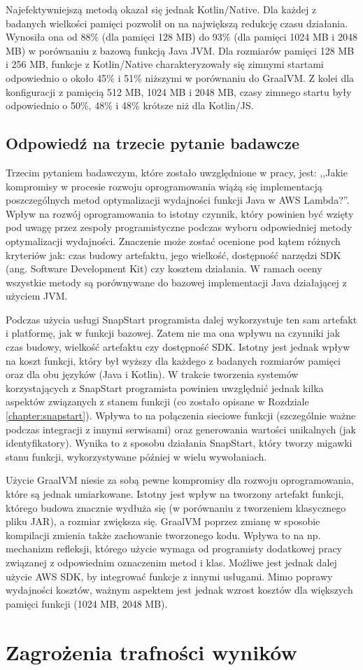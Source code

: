 Najefektywniejszą metodą okazał się jednak Kotlin/Native.
Dla każdej z badanych wielkości pamięci pozwolił on na największą redukcję czasu działania.
Wynosiła ona od 88\% (dla pamięci 128 MB) do 93\% (dla pamięci 1024 MB i 2048 MB) w porównaniu z bazową funkcją Java JVM.
Dla rozmiarów pamięci 128 MB i 256 MB, funkcje z Kotlin/Native charakteryzowały się zimnymi startami odpowiednio o około 45\% i 51\% niższymi w porównaniu do GraalVM.
Z kolei dla konfiguracji z pamięcią 512 MB, 1024 MB i 2048 MB, czasy zimnego startu były odpowiednio o 50\%, 48\% i 48\% krótsze niż dla Kotlin/JS.

\subsection*{Odpowiedź na trzecie pytanie badawcze}

Trzecim pytaniem badawczym, które zostało uwzględnione w pracy, jest: ,,Jakie kompromisy w procesie rozwoju oprogramowania wiążą się implementacją poszczególnych metod optymalizacji wydajności funkcji Java w AWS Lambda?''.
Wpływ na rozwój oprogramowania to istotny czynnik, który powinien być wzięty pod uwagę przez zespoły programistyczne podczas wyboru odpowiedniej metody optymalizacji wydajności.
Znaczenie może zostać ocenione pod kątem różnych kryteriów jak: czas budowy artefaktu, jego wielkość, dostępność narzędzi SDK (ang. Software Development Kit) czy kosztem działania.
W ramach oceny wszystkie metody są porównywane do bazowej implementacji Java działającej z użyciem JVM.

Podczas użycia usługi SnapStart programista dalej wykorzystuje ten sam artefakt i platformę, jak w funkcji bazowej.
Zatem nie ma ona wpływu na czynniki jak czas budowy, wielkość artefaktu czy dostępność SDK.
Istotny jest jednak wpływ na koszt funkcji, który był wyższy dla każdego z badanych rozmiarów pamięci oraz dla obu języków (Java i Kotlin).
W trakcie tworzenia systemów korzystających z SnapStart programista powinien uwzględnić jednak kilka aspektów związanych z stanem funkcji (co zostało opisane w Rozdziale \ref{chapter:snapstart}).
Wpływa to na połączenia sieciowe funkcji (szczególnie ważne podczas integracji z innymi serwisami) oraz generowania wartości unikalnych (jak identyfikatory).
Wynika to z sposobu działania SnapStart, który tworzy migawki stanu funkcji, wykorzystywane później w wielu wywołaniach.

Użycie GraalVM niesie za sobą pewne kompromisy dla rozwoju oprogramowania, które są jednak umiarkowane.
Istotny jest wpływ na tworzony artefakt funkcji, którego budowa znacznie wydłuża się (w porównaniu z tworzeniem klasycznego pliku JAR), a rozmiar zwiększa się.
GraalVM poprzez zmianę w sposobie kompilacji zmienia także zachowanie tworzonego kodu.
Wpływa to na np. mechanizm refleksji, którego użycie wymaga od programisty dodatkowej pracy związanej z odpowiednim oznaczenim metod i klas.
Możliwe jest jednak dalej użycie AWS SDK, by integrować funkcje z innymi usługami.
Mimo poprawy wydajności kosztów, ważnym aspektem jest jednak wzrost kosztów dla większych pamięci funkcji (1024 MB, 2048 MB).



\section{Zagrożenia trafności wyników}\label{chapter:zagrozenia_trafnosci_wynikow}

